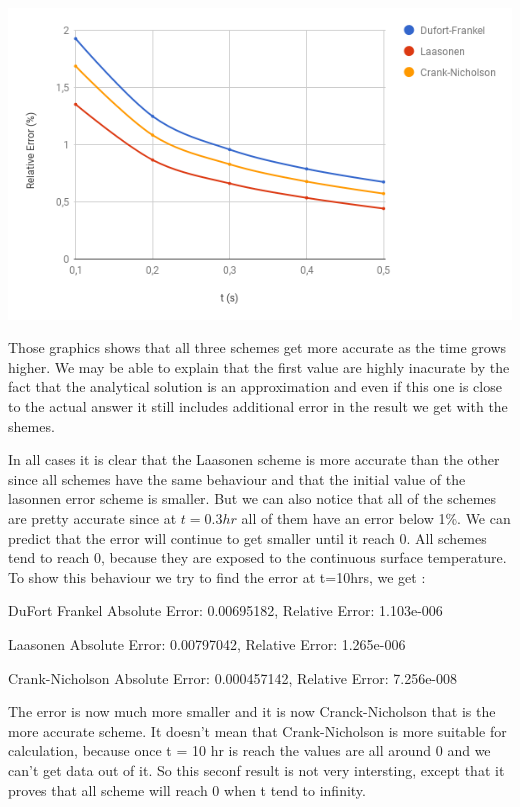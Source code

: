 \documentclass [10 pt, a4 paper]{article}
\begin{document}
\begin{center} 
    \includegraphics[scale=0.5]{Chart/RelativeError.PNG}
\end{center}

Those graphics shows that all three schemes get more accurate as the time grows higher.
We may be able to explain that the first value are highly inacurate by the fact that the analytical 
solution is an approximation and even if this one is close to the actual answer it still includes 
additional error in the result we get with the shemes.

In all cases it is clear that the Laasonen scheme is more accurate than the other since all schemes have
the same behaviour and that the initial value of the lasonnen error scheme is smaller. 
But we can also notice that all of the schemes are pretty accurate since at $t = 0.3 hr$ all 
of them have an error below 1\%. We can predict that the error will continue to get smaller until 
it reach 0. All schemes tend to reach 0, because they are exposed to the continuous surface temperature. 
To show this behaviour we try to find the error at t=10hrs, we get :

DuFort Frankel Absolute Error: 0.00695182,  Relative Error: 1.103e-006

Laasonen Absolute Error: 0.00797042, Relative Error: 1.265e-006

Crank-Nicholson Absolute Error: 0.000457142, Relative Error: 7.256e-008
\vspace{0.1cm}

The error is now much more smaller and it is now Cranck-Nicholson that is the more accurate scheme.
It doesn't mean that Crank-Nicholson is more suitable for calculation, because once t = 10 hr is reach the
values are all around 0 and we can't get data out of it.
So this seconf result is not very intersting, except that it proves that all scheme will reach 0 when t tend 
to infinity.
\end{document}
